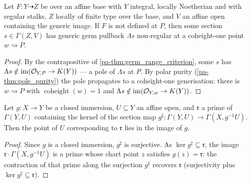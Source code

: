 \begin{theorem}
  \label{pa-thm:pole_existence}
  \leanok

  Let \(F : Y \dashrightarrow Z\) be over an affine base with \(Y\) integral,
  locally Noetherian and with regular stalks, \(Z\) locally of finite type over
  the base, and \(V\) an affine open containing the generic image. If \(F\) is
  not defined at \(P\), then some section \(s \in \Gamma(Z, V)\) has generic germ
  pullback \(\Lambda s\) non-regular at a coheight-one point \(w \rightsquigarrow
  P\).
\end{theorem}
\begin{proof}
  \leanok
  By the contrapositive of \ref{pa-thm:germ_range_criterion}, some \(s\) has
  \(\Lambda s \notin \operatorname{im}(\mathcal{O}_{Y,P} \to K(Y))\) --- a pole of
  \(\Lambda s\) at \(P\). By polar purity (\ref{pa-thm:pole_purity}) the pole
  propagates to a coheight-one generisation: there is \(w \rightsquigarrow P\)
  with \(\operatorname{coheight}(w) = 1\) and \(\Lambda s \notin
  \operatorname{im}(\mathcal{O}_{Y,w} \to K(Y))\).
\end{proof}

\begin{lemma}
  \label{pa-lem:chart_image_point}
  \leanok

  Let \(g : X \to Y\) be a closed immersion, \(U \subseteq Y\) an affine open,
  and \(\mathfrak r\) a prime of \(\Gamma(Y, U)\) containing the kernel of the
  section map \(g^\sharp : \Gamma(Y, U) \to \Gamma(X, g^{-1}U)\). Then the point
  of \(U\) corresponding to \(\mathfrak r\) lies in the image of \(g\).
\end{lemma}
\begin{proof}
  \leanok
  Since \(g\) is a closed immersion, \(g^\sharp\) is surjective. As
  \(\ker g^\sharp \subseteq \mathfrak r\), the image \(\mathfrak r \cdot
  \Gamma(X, g^{-1}U)\) is a prime whose chart point \(z\) satisfies \(g(z) =
  \mathfrak r\): the contraction of that prime along the surjection \(g^\sharp\)
  recovers \(\mathfrak r\) (surjectivity plus \(\ker g^\sharp \subseteq
  \mathfrak r\)).
\end{proof}

